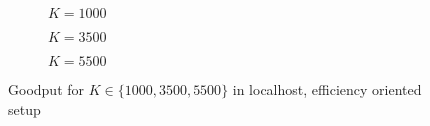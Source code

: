 
\begin{figure}[t]
\centering
\begin{subfigure}{0.24\textwidth}
	\captionsetup{justification=centering,font=scriptsize}
	\centering
	\setlength\fwidth{\textwidth}
	\setlength{}
	\caption{$K=1000$}
	\label{fig:lh_good_1000_eff}
\end{subfigure}\hspace{2em}%
\begin{subfigure}{0.23\textwidth}
	\captionsetup{justification=centering,font=scriptsize}
	\centering
	\setlength\fwidth{\textwidth}
	\setlength{}
	\caption{$K=3500$}
	\label{fig:lh_good_3500_eff}
\end{subfigure}\hspace{2em}%
\begin{subfigure}{0.23\textwidth}
	\captionsetup{justification=centering,font=scriptsize}
	\centering
	\setlength\fwidth{\textwidth}
	\setlength{}
	\caption{$K=5500$}
	\label{fig:lh_good_5500_eff}
\end{subfigure}
\caption{Goodput for $K \in \{1000, 3500, 5500\}$ in localhost, efficiency oriented setup}
\label{fig:goodput_nonaggr}
\end{figure}

